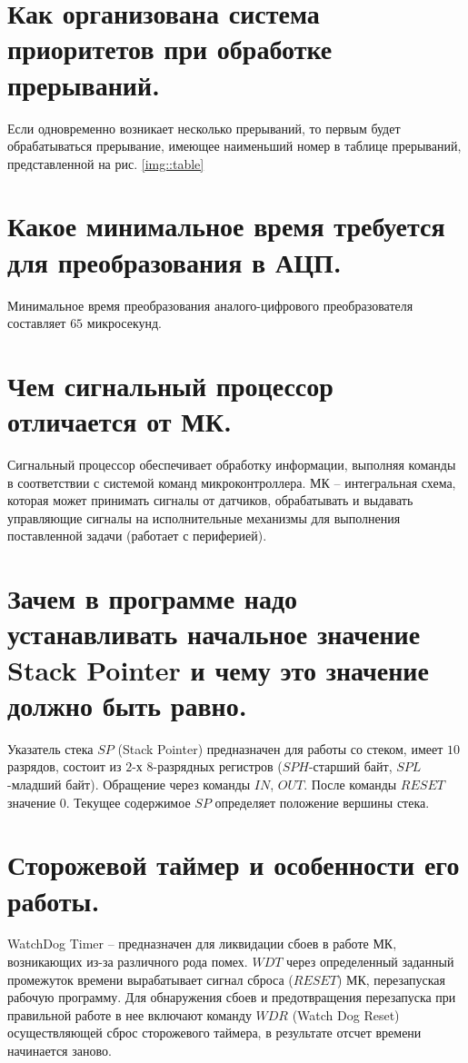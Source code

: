 \section{Как организована система приоритетов при обработке прерываний. }
Если одновременно возникает несколько прерываний, то первым будет 
обрабатываться прерывание, имеющее наименьший номер в таблице прерываний, представленной на рис. \ref{img::table}

\section{Какое минимальное время требуется для преобразования в АЦП.}
Минимальное время преобразования аналого-цифрового преобразователя 
составляет $65$ микросекунд.

\section{Чем сигнальный процессор отличается от МК.}

Сигнальный процессор обеспечивает обработку информации, выполняя команды в соответствии с 
системой команд микроконтроллера. 
МК – интегральная схема, которая может принимать сигналы от датчиков, обрабатывать и 
выдавать управляющие сигналы на исполнительные механизмы для выполнения поставленной задачи 
(работает с периферией).

\section{Зачем в программе надо устанавливать начальное значение Stack Pointer и чему это значение должно быть равно.}

Указатель стека $SP$ (Stack Pointer) предназначен для работы со стеком, имеет $10$ разрядов, 
состоит из $2$-х $8$-разрядных регистров ($SPH$-старший байт, $SPL$-младший байт). Обращение 
через команды $IN$, $OUT$. После команды $RESET$ значение $0$. 
Текущее содержимое $SP$ определяет положение вершины стека. 

\section{Сторожевой таймер и особенности его работы.}

WatchDog Timer – предназначен для ликвидации сбоев в работе МК, возникающих из-за различного
рода помех. $WDT$ через определенный заданный промежуток времени вырабатывает сигнал сброса 
($RESET$) МК, перезапуская рабочую программу. Для обнаружения сбоев и предотвращения 
перезапуска при правильной работе в нее включают команду $WDR$ (Watch Dog Reset) 
осуществляющей сброс сторожевого таймера, в результате отсчет времени начинается заново.

